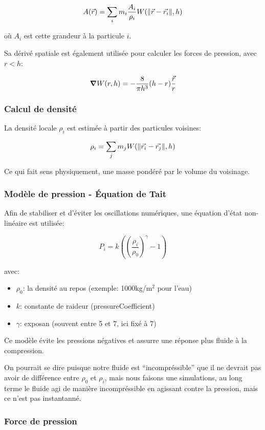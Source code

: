 \documentclass{article}
\begin{document}
\[
    A(\vec{r}) = \sum_{i} m_i \frac{A_i}{\rho_i} W(\norm{\vec{r} - \vec{r_i}}, h)
\]

où \(A_i\) est cette grandeur à la particule \(i\).

Sa dérivé spatiale est également utilisée pour calculer les forces de pression, avec \(r < h\):

\[
    \grad W(r, h) = -\frac{8}{\pi h^3}(h - r)\frac{\vec{r}}{r}
\]

\subsubsection{Calcul de densité}

La densité locale \(\rho_i\) est estimée à partir des particules voisines:

\[
    \rho_i = \sum_j m_j W(\norm{\vec{r_i} - \vec{r_j}}, h)
\]

Ce qui fait sens physiquement, une masse pondéré par le volume du voisinage.

\subsubsection{Modèle de pression - Équation de Tait}

Afin de stabiliser et d'éviter les oscillations numériques, une équation d'état non-linéaire est utilisée:

\[
    P_i =  k \left (\left ( \frac{\rho_i}{\rho_0}\right )^\gamma - 1 \right )
\]

avec:

\begin{itemize}
    \item \(\rho_0\): la densité au repos (exemple: 1000kg/m\(^2\) pour l'eau)
    \item \(k\): constante de raideur (pressureCoefficient)
    \item \(\gamma\): exposan (souvent entre 5 et 7, ici fixé à 7)
\end{itemize}

Ce modèle évite les pressions négatives et assurre une réponse plus fluide à la compression.

On pourrait se dire puisque notre fluide est ``incompréssible'' que il ne devrait pas avoir de différence entre \(\rho_0\) et \(\rho_i\), mais nous faisons une simulations, au long terme le fluide agi de manière incompréssible en agissant contre la pression, mais ce n'est pas instantanné.

\subsubsection{Force de pression}
\end{document}
